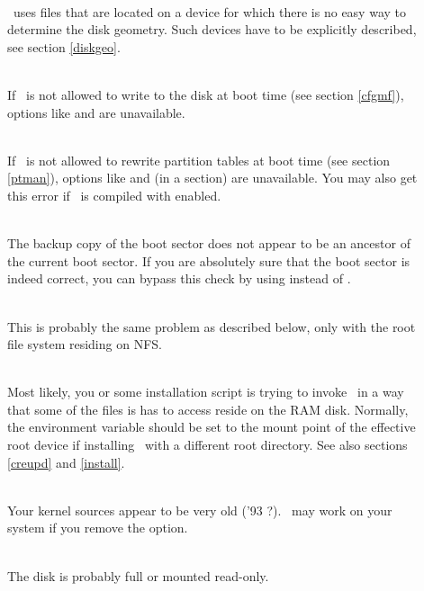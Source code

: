 \begin{description}
  \item[]~\\
    \LILO\ uses files that are located on a device for which
    there is no easy way to determine the disk geometry. Such devices have
    to be explicitly described, see section \ref{diskgeo}.
  \item[]~\\
    If \LILO\ is not allowed to write to the disk at boot time (see section
    \ref{cfgmf}), options like  and  are unavailable.
  \item[]~\\
    If \LILO\ is not allowed to rewrite partition tables at boot time (see
    section \ref{ptman}), options like  and  (in a
     section) are unavailable. You may also get this error if
    \LILO\ is compiled with  enabled.
  \item[]~\\
    The backup copy of the boot sector does not appear to be an ancestor of
    the current boot sector. If you are absolutely sure that the boot sector
    is indeed correct, you can bypass this check by using  instead
    of .
  \item[]~\\
    This is probably the same problem as described below, only with the
    root file system residing on NFS.
  \item[]~\\
    Most likely, you or some installation script is trying to invoke
    \LILO\ in a way that some of the files is has to access reside on the
    RAM disk. Normally, the  environment variable should be set
    to the mount point of the effective root device if installing
    \LILO\ with a different root directory. See also sections \ref{creupd}
    and \ref{install}.
  \item[]~\\
    Your kernel sources appear to be very old ('93 ?). \LILO\ may work on
    your system if you remove the  option.
  \item[]~\\
    The disk is probably full or mounted read-only.
\end{description}


